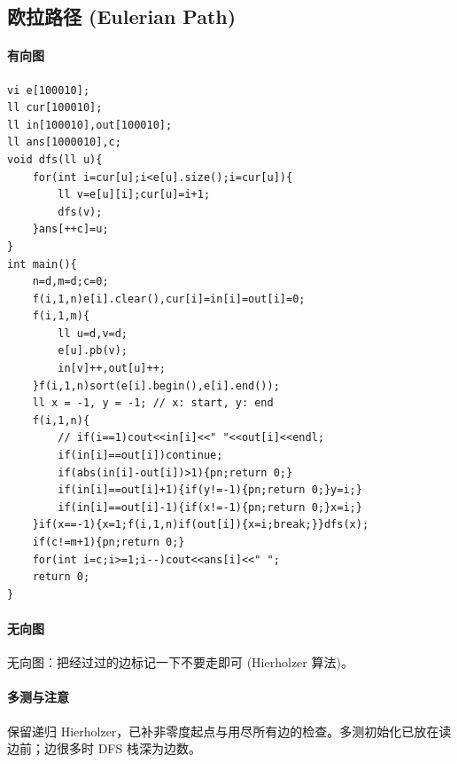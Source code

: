 \subsection{欧拉路径 (Eulerian Path)}
\paragraph{有向图}
\begin{lstlisting}
vi e[100010];
ll cur[100010];
ll in[100010],out[100010];
ll ans[1000010],c;
void dfs(ll u){
	for(int i=cur[u];i<e[u].size();i=cur[u]){
		ll v=e[u][i];cur[u]=i+1;
		dfs(v);
	}ans[++c]=u;
}
int main(){
	n=d,m=d;c=0;
    f(i,1,n)e[i].clear(),cur[i]=in[i]=out[i]=0;
    f(i,1,m){
		ll u=d,v=d;
		e[u].pb(v);
		in[v]++,out[u]++;
	}f(i,1,n)sort(e[i].begin(),e[i].end());
	ll x = -1, y = -1; // x: start, y: end
	f(i,1,n){
		// if(i==1)cout<<in[i]<<" "<<out[i]<<endl;
		if(in[i]==out[i])continue;
		if(abs(in[i]-out[i])>1){pn;return 0;}
		if(in[i]==out[i]+1){if(y!=-1){pn;return 0;}y=i;}
		if(in[i]==out[i]-1){if(x!=-1){pn;return 0;}x=i;}
	}if(x==-1){x=1;f(i,1,n)if(out[i]){x=i;break;}}dfs(x);
    if(c!=m+1){pn;return 0;}
	for(int i=c;i>=1;i--)cout<<ans[i]<<" ";
	return 0;
}
\end{lstlisting}

\paragraph{无向图}
无向图：把经过过的边标记一下不要走即可 (Hierholzer 算法)。

\paragraph{多测与注意} 保留递归 Hierholzer，已补非零度起点与用尽所有边的检查。多测初始化已放在读边前；边很多时 DFS 栈深为边数。
